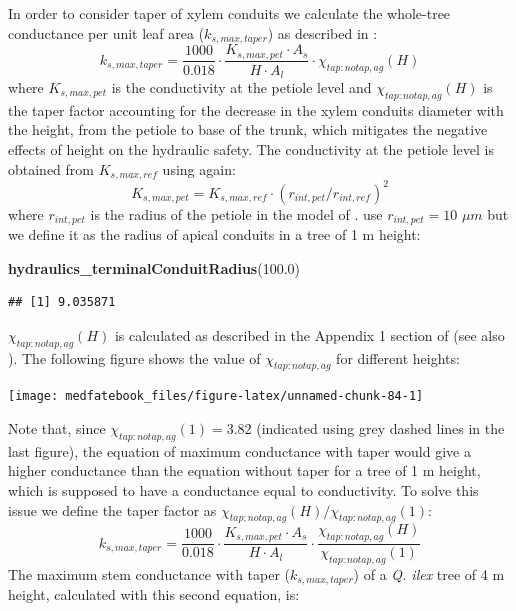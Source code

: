 \documentclass[]{book}
\newenvironment{Shaded}{\begin{snugshade}}{\end{snugshade}}
\newcommand{\KeywordTok}[1]{\textcolor[rgb]{0.13,0.29,0.53}{\textbf{#1}}}
\newcommand{\FloatTok}[1]{\textcolor[rgb]{0.00,0.00,0.81}{#1}}
\newcommand{\NormalTok}[1]{#1}
\begin{document}
In order to consider taper of xylem conduits we calculate the whole-tree conductance per unit leaf area (\(k_{s, max, taper}\)) as described in \citet{Christoffersen2016}:
\begin{equation}
k_{s, max, taper}=\frac{1000}{0.018} \cdot \frac{K_{s,max,pet}\cdot A_{s}}{H\cdot A_{l}}\cdot \chi_{tap:notap,ag}(H)
\end{equation}
where \(K_{s,max,pet}\) is the conductivity at the petiole level and \(\chi_{tap:notap,ag}(H)\) is the taper factor accounting for the decrease in the xylem conduits diameter with the height, from the petiole to base of the trunk, which mitigates the negative effects of height on the hydraulic safety. The conductivity at the petiole level is obtained from \(K_{s,max,ref}\) using again:
\begin{equation}
K_{s,max,pet} = K_{s,max,ref}\cdot (r_{int, pet}/r_{int,ref})^{2}
\end{equation}
where \(r_{int, pet}\) is the radius of the petiole in the model of \citet{Savage2010}. \citet{Christoffersen2016} use \(r_{int, pet} = 10\) \(\mu m\) but we define it as the radius of apical conduits in a tree of 1 m height:

\begin{Shaded}
\begin{Highlighting}[]
\KeywordTok{hydraulics_terminalConduitRadius}\NormalTok{(}\FloatTok{100.0}\NormalTok{)}
\end{Highlighting}
\end{Shaded}

\begin{verbatim}
## [1] 9.035871
\end{verbatim}

\(\chi_{tap:notap,ag}(H)\) is calculated as described in the Appendix 1 section of \citet{Christoffersen2016} (see also \citet{Savage2010}). The following figure shows the value of \(\chi_{tap:notap,ag}\) for different heights:

\begin{center}\texttt{[image: medfatebook\_files/figure-latex/unnamed-chunk-84-1]} \end{center}

Note that, since \(\chi_{tap:notap,ag}(1) = 3.82\) (indicated using grey dashed lines in the last figure), the equation of maximum conductance with taper would give a higher conductance than the equation without taper for a tree of 1 m height, which is supposed to have a conductance equal to conductivity. To solve this issue we define the taper factor as \(\chi_{tap:notap,ag}(H)/\chi_{tap:notap,ag}(1)\):
\begin{equation}
k_{s, max, taper}=\frac{1000}{0.018} \cdot \frac{K_{s,max,pet}\cdot A_{s}}{H\cdot A_{l}}\cdot \frac{\chi_{tap:notap,ag}(H)}{\chi_{tap:notap,ag}(1)}
\end{equation}
The maximum stem conductance with taper (\(k_{s, max, taper}\)) of a \emph{Q. ilex} tree of 4 m height, calculated with this second equation, is:
\end{document}
